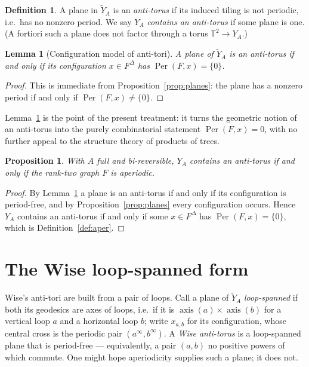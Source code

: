 \documentclass[11pt,reqno]{amsart}
\theoremstyle{plain}
\newtheorem{proposition}[theorem]{Proposition}
\newtheorem{lemma}[theorem]{Lemma}
\theoremstyle{definition}
\newtheorem{definition}[theorem]{Definition}
\newcommand{\Per}{\operatorname{Per}}
\newcommand{\axis}{\operatorname{axis}}
\begin{document}
\begin{definition}\label{def:antitorus}
A plane in $\widetilde Y_A$ is an \emph{anti-torus} if its induced tiling is not
periodic, i.e.\ has no nonzero period. We say $Y_A$ \emph{contains an anti-torus}
if some plane is one. (A fortiori such a plane does not factor through a torus
$\mathbb T^2\to Y_A$.)
\end{definition}

\begin{lemma}[Configuration model of anti-tori]\label{lem:config}
A plane of $\widetilde Y_A$ is an anti-torus if and only if its configuration
$x\in F^\Delta$ has $\Per(F,x)=\{0\}$.
\end{lemma}

\begin{proof}
This is immediate from Proposition~\ref{prop:planes}: the plane has a nonzero period if and only if
$\Per(F,x)\neq\{0\}$.
\end{proof}

Lemma~\ref{lem:config} is the point of the present treatment: it turns the
geometric notion of an anti-torus into the purely combinatorial statement
$\Per(F,x)=0$, with no further appeal to the structure theory of products of trees.

\begin{proposition}\label{prop:antitorus}
With $A$ full and bi-reversible, $Y_A$ contains an anti-torus if and only if the
rank-two graph $F$ is aperiodic.
\end{proposition}

\begin{proof}
By Lemma~\ref{lem:config} a plane is an anti-torus if and only if its configuration is
period-free, and by Proposition~\ref{prop:planes} every configuration occurs.
Hence $Y_A$ contains an anti-torus if and only if some $x\in F^\Delta$ has $\Per(F,x)=\{0\}$,
which is Definition~\ref{def:aper}.
\end{proof}

\section{The Wise loop-spanned form}\label{sec:loops}

Wise's anti-tori \cite{W} are built from a pair of loops. Call a plane of
$\widetilde Y_A$ \emph{loop-spanned} if both its geodesics are axes of loops, i.e.\
if it is $\axis(a)\times\axis(b)$ for a vertical loop $a$ and a horizontal loop $b$;
write $x_{a,b}$ for its configuration, whose central cross is the periodic pair
$(a^\infty,b^\infty)$. A \emph{Wise anti-torus} is a loop-spanned plane that is
period-free --- equivalently, a pair $(a,b)$ no positive powers of which commute. One
might hope aperiodicity supplies such a plane; it does not.
\end{document}
